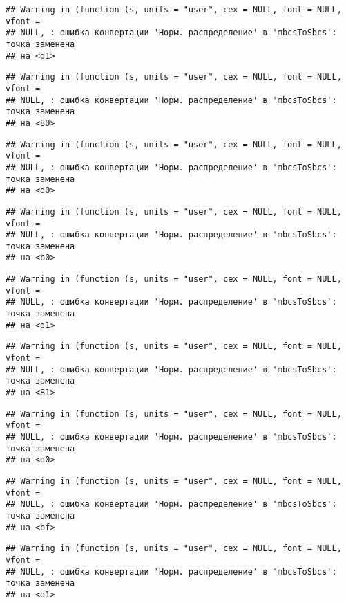\documentclass[
]{article}
\begin{document}
\begin{verbatim}
## Warning in (function (s, units = "user", cex = NULL, font = NULL, vfont =
## NULL, : ошибка конвертации 'Норм. распределение' в 'mbcsToSbcs': точка заменена
## на <d1>
\end{verbatim}

\begin{verbatim}
## Warning in (function (s, units = "user", cex = NULL, font = NULL, vfont =
## NULL, : ошибка конвертации 'Норм. распределение' в 'mbcsToSbcs': точка заменена
## на <80>
\end{verbatim}

\begin{verbatim}
## Warning in (function (s, units = "user", cex = NULL, font = NULL, vfont =
## NULL, : ошибка конвертации 'Норм. распределение' в 'mbcsToSbcs': точка заменена
## на <d0>
\end{verbatim}

\begin{verbatim}
## Warning in (function (s, units = "user", cex = NULL, font = NULL, vfont =
## NULL, : ошибка конвертации 'Норм. распределение' в 'mbcsToSbcs': точка заменена
## на <b0>
\end{verbatim}

\begin{verbatim}
## Warning in (function (s, units = "user", cex = NULL, font = NULL, vfont =
## NULL, : ошибка конвертации 'Норм. распределение' в 'mbcsToSbcs': точка заменена
## на <d1>
\end{verbatim}

\begin{verbatim}
## Warning in (function (s, units = "user", cex = NULL, font = NULL, vfont =
## NULL, : ошибка конвертации 'Норм. распределение' в 'mbcsToSbcs': точка заменена
## на <81>
\end{verbatim}

\begin{verbatim}
## Warning in (function (s, units = "user", cex = NULL, font = NULL, vfont =
## NULL, : ошибка конвертации 'Норм. распределение' в 'mbcsToSbcs': точка заменена
## на <d0>
\end{verbatim}

\begin{verbatim}
## Warning in (function (s, units = "user", cex = NULL, font = NULL, vfont =
## NULL, : ошибка конвертации 'Норм. распределение' в 'mbcsToSbcs': точка заменена
## на <bf>
\end{verbatim}

\begin{verbatim}
## Warning in (function (s, units = "user", cex = NULL, font = NULL, vfont =
## NULL, : ошибка конвертации 'Норм. распределение' в 'mbcsToSbcs': точка заменена
## на <d1>
\end{verbatim}
\end{document}

